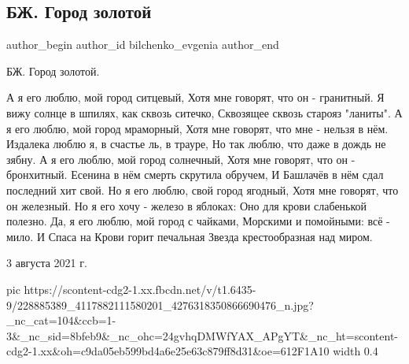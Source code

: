  
 
 
 
 
 
\subsection{БЖ. Город золотой}
\label{sec:03_08_2021.fb.bilchenko_evgenia.4.gorod_zolotoj}
 
\ifcmt
 author_begin
   author_id bilchenko_evgenia
 author_end
\fi

БЖ. Город золотой.

\begin{multicols}{2}
\obeycr
А я его люблю, мой город ситцевый, 
Хотя мне говорят, что он - гранитный.
Я вижу солнце в шпилях, как сквозь ситечко,
Сквозящее сквозь старояз "ланиты".
\smallskip
А я его люблю, мой город мраморный,
Хотя мне говорят, что мне - нельзя в нём.
Издалека люблю я, в счастье ль, в трауре,
Но так люблю, что даже в дождь не зябну.
\smallskip
А я его люблю, мой город солнечный,
Хотя мне говорят, что он - бронхитный.
Есенина в нём смерть скрутила обручем,
И Башлачёв в нём сдал последний хит свой.
\smallskip
Но я его люблю, свой город ягодный,
Хотя мне говорят, что он железный.
Но я его хочу - железо в яблоках:
Оно для крови слабенькой полезно.
\smallskip
Да, я его люблю, мой город с чайками,
Морскими и помойными: всё - мило.
И Спаса на Крови горит печальная
Звезда крестообразная над миром.
\restorecr
\end{multicols}

3 августа 2021 г.

\ifcmt
  pic https://scontent-cdg2-1.xx.fbcdn.net/v/t1.6435-9/228885389_4117882111580201_4276318350866690476_n.jpg?_nc_cat=104&ccb=1-3&_nc_sid=8bfeb9&_nc_ohc=24gvhqDMWfYAX_APgYT&_nc_ht=scontent-cdg2-1.xx&oh=c9da05eb599bd4a6e25e63c879ff8d31&oe=612F1A10
  width 0.4
\fi


